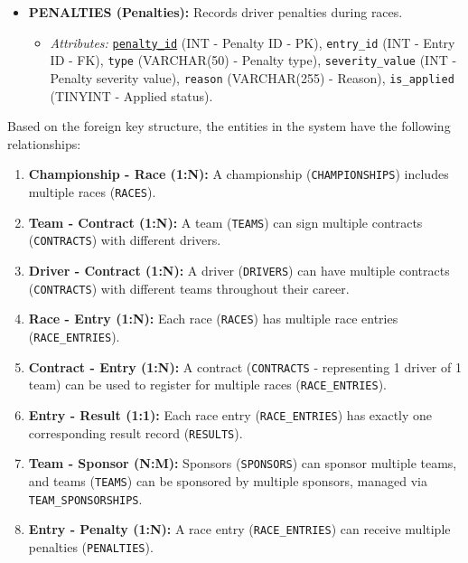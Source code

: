\documentclass[12pt, a4paper]{report}
\begin{document}
\begin{tcolorbox}
\begin{itemize}[leftmargin=1.5cm]
    \item \textbf{PENALTIES (Penalties):} Records driver penalties during races.
    \begin{itemize}
        \item \textit{Attributes:} \texttt{\underline{penalty\_id}} (INT - Penalty ID - PK), \texttt{entry\_id} (INT - Entry ID - FK), \texttt{type} (VARCHAR(50) - Penalty type), \texttt{severity\_value} (INT - Penalty severity value), \texttt{reason} (VARCHAR(255) - Reason), \texttt{is\_applied} (TINYINT - Applied status).
    \end{itemize}
\end{itemize}
\end{tcolorbox}

Based on the foreign key structure, the entities in the system have the following relationships:

\begin{enumerate}[leftmargin=1.5cm]
    \item \textbf{Championship - Race (1:N):} A championship (\texttt{CHAMPIONSHIPS}) includes multiple races (\texttt{RACES}).
    \item \textbf{Team - Contract (1:N):} A team (\texttt{TEAMS}) can sign multiple contracts (\texttt{CONTRACTS}) with different drivers.
    \item \textbf{Driver - Contract (1:N):} A driver (\texttt{DRIVERS}) can have multiple contracts (\texttt{CONTRACTS}) with different teams throughout their career.
    \item \textbf{Race - Entry (1:N):} Each race (\texttt{RACES}) has multiple race entries (\texttt{RACE\_ENTRIES}).
    \item \textbf{Contract - Entry (1:N):} A contract (\texttt{CONTRACTS} - representing 1 driver of 1 team) can be used to register for multiple races (\texttt{RACE\_ENTRIES}).
    \item \textbf{Entry - Result (1:1):} Each race entry (\texttt{RACE\_ENTRIES}) has exactly one corresponding result record (\texttt{RESULTS}).
    \item \textbf{Team - Sponsor (N:M):} Sponsors (\texttt{SPONSORS}) can sponsor multiple teams, and teams (\texttt{TEAMS}) can be sponsored by multiple sponsors, managed via \texttt{TEAM\_SPONSORSHIPS}.
    \item \textbf{Entry - Penalty (1:N):} A race entry (\texttt{RACE\_ENTRIES}) can receive multiple penalties (\texttt{PENALTIES}).
\end{enumerate}
\end{document}

